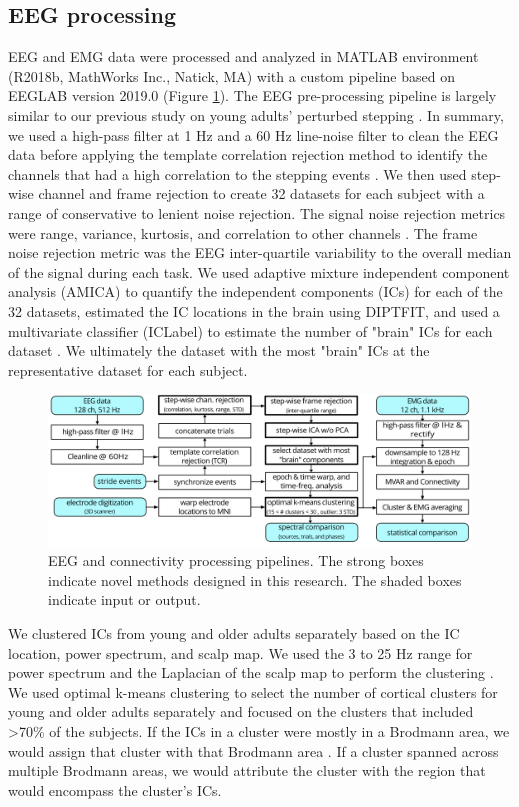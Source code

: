 \documentclass[../thesis_seyed.tex]{subfiles}
\begin{document}
\subsection{EEG processing}
EEG and EMG data were processed and analyzed in MATLAB environment (R2018b, MathWorks Inc., Natick, MA) with a custom pipeline based on EEGLAB version 2019.0 \cite{Delorme2004-yy} (Figure \ref{fig:connProcc}). The EEG pre-processing pipeline is largely similar to our previous study on young adults' perturbed stepping \cite{Shirazi2021-ha}. In summary, we used a high-pass filter at 1 Hz and a 60 Hz line-noise filter to clean the EEG data before applying the template correlation rejection method to identify the channels that had a high correlation to the stepping events \cite{Oliveira2017-pk}. We then used step-wise channel and frame rejection to create 32 datasets for each subject with a range of conservative to lenient noise rejection. The signal noise rejection metrics were range, variance, kurtosis, and correlation to other channels \cite{Bigdely-Shamlo2015-ow}. The frame noise rejection metric was the EEG inter-quartile variability to the overall median of the signal during each task. We used adaptive mixture independent component analysis (AMICA) to quantify the independent components (ICs) for each of the 32 datasets, estimated the IC locations in the brain using DIPTFIT, and used a multivariate classifier (ICLabel) to estimate the number of "brain" ICs for each dataset \cite{Palmer2008-jx,Pion-Tonachini2019-gv}. We ultimately the dataset with the most "brain" ICs at the representative dataset for each subject.

\begin{figure}[tb]
    \centering
    \includegraphics[width=\linewidth]{../img/figure 1 - workflow.jpg}
    \caption{EEG and connectivity processing pipelines. The strong boxes indicate novel methods designed in this research. The shaded boxes indicate input or output.}
    \label{fig:connProcc}
\end{figure}

We clustered ICs from young and older adults separately based on the IC location, power spectrum, and scalp map. We used the 3 to 25 Hz range for power spectrum and the Laplacian of the scalp map to perform the clustering \cite{Hjorth1975-ea}. We used optimal k-means clustering to select the number of cortical clusters for young and older adults separately and focused on the clusters that included >70\% of the subjects. If the ICs in a cluster were mostly in a Brodmann area, we would assign that cluster with that Brodmann area \cite{Lancaster2000-aj,Shirazi2019-im}. If a cluster spanned across multiple Brodmann areas, we would attribute the cluster with the region that would encompass the cluster's ICs.
\end{document}
